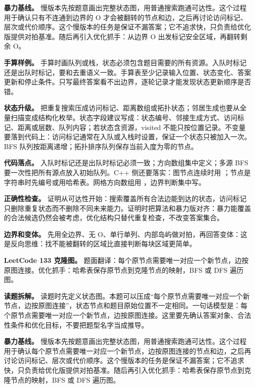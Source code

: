 \textbf{暴力基线。} 慢版本先按题意画出完整状态图，用普通搜索跑通可达性。这个过程用于确认只有不连通到边界的 O 才会被翻转的节点和边，之后再讨论访问标记、层次或代价顺序。这个慢版本的任务是保证不漏答案；它不追求快，只负责给优化版提供对拍基准。随后再引入优化抓手：从边界 O 出发标记安全区域，再翻转剩余 O。

\textbf{手算样例。} 手算时画队列或栈，状态必须包含题目需要的所有资源。入队时标记还是出队时标记，要和去重语义一致。手算表至少记录输入位置、状态变化、答案更新和停止条件。只写最终答案看不出边界，逐轮记录才能发现状态更新顺序是否错。

\textbf{状态升级。} 把重复搜索压成访问标记、距离数组或拓扑状态；邻居生成也要从全量扫描变成结构化枚举。状态字段建议写成：状态编号、邻接生成方式、访问标记、距离或层数、队列内容；若状态含资源，visited 不能只按位置记录。不变量要落到代码上：访问标记通常在入队或入栈时设置，保证一个状态只被加入一次。BFS 队列按距离递增；拓扑排序队列保存当前入度为零的节点。

\textbf{代码落点。} 入队时标记还是出队时标记必须一致；方向数组集中定义；多源 BFS 要一次性把所有源点放入初始队列。C++ 侧还要落实：图节点连续时用 ；节点是字符串时先编号或用哈希表。网格方向数组用 ，边界判断集中写。

\textbf{正确性检查。} 证明从可达性开始：搜索覆盖所有合法边能到达的状态，访问标记只删除重复状态而不删除不同未来能力。证明时把算法和暴力版对齐：暴力能覆盖的合法候选仍然会被考虑，优化结构只替代重复检查，不改变答案集合。

\textbf{边界和变体。} 先用全边界、无 O、单行单列、内部岛屿做对拍，再回答变体：这是反向思维：找不能被翻转的区域比直接判断每块区域更简单。

\noindent\textbf{LeetCode 133 克隆图。} 题面翻译：每个原节点需要唯一对应一个新节点，边按原图连接。优化抓手：哈希表保存原节点到克隆节点的映射，BFS 或 DFS 遍历图。

\textbf{读题拆解。} 读题时先定义状态图。本题可以压成“每个原节点需要唯一对应一个新节点，边按原图连接”，状态节点和题目原始位置不一定相同。一句话模型是：每个原节点需要唯一对应一个新节点，边按原图连接。这里要先确认答案对象、合法性条件和优化目标，不要把题型名字当成推导。

\textbf{暴力基线。} 慢版本先按题意画出完整状态图，用普通搜索跑通可达性。这个过程用于确认每个原节点需要唯一对应一个新节点，边按原图连接的节点和边，之后再讨论访问标记、层次或代价顺序。这个慢版本的任务是保证不漏答案；它不追求快，只负责给优化版提供对拍基准。随后再引入优化抓手：哈希表保存原节点到克隆节点的映射，BFS 或 DFS 遍历图。

